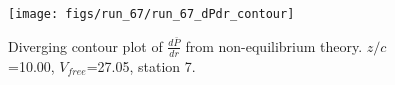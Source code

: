 \begin{figure}[H]
\centering
\texttt{[image: figs/run\_67/run\_67\_dPdr\_contour]}
\caption{Diverging contour plot of $\frac{d\bar{P}}{dr}$ from non-equilibrium theory. $z/c$=10.00, $V_{free}$=27.05, station 7.}
\label{fig:run_67_dPdr_contour}
\end{figure}


